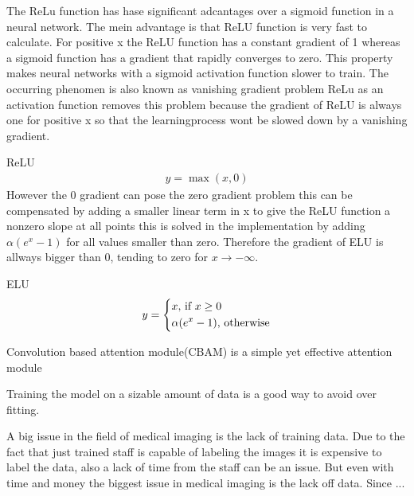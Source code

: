 \documentclass[
a4paper, 
12pt,
grayscalebody, %
abstract=on,
twoside, BCOR10mm, 12pt, DIV13,headinclude, footexclude, final, abstracton, openright
]{ibireprt}
\numberwithin{equation}{chapter}
\numberwithin{table}{chapter}
\numberwithin{figure}{chapter}
\numberwithin{algorithm}{chapter}
\numberwithin{example}{chapter}
\numberwithin{example}{chapter}
\begin{document}
The ReLu function has hase significant adcantages over a sigmoid function in a neural network. The mein advantage is that ReLU function is very fast to calculate. For positive x the ReLU function has a constant gradient of 1 whereas a sigmoid function has a gradient that rapidly converges to zero. This property makes neural networks with a sigmoid activation function slower to train. The occurring phenomen is also known as vanishing gradient problem %
ReLu as an activation function removes this problem because the gradient of ReLU is always one for positive x so that the learningprocess wont be slowed down by a vanishing gradient. 

 

ReLU
\begin{align}
	y = \max(x,0)
\end{align}
However the 0 gradient can pose the zero gradient problem this can be compensated by adding a smaller linear term in x to give the ReLU function a nonzero slope at all points this is solved in the implementation by adding $\alpha(e^x-1)$ for all values smaller than zero. Therefore the gradient of ELU is allways bigger than 0, tending to zero for $x \rightarrow - \infty$.

ELU
\begin{align}
	y = 
	\begin{dcases}
		x \text{, if } x \geq 0 \\
		\alpha(e^x-1) \text{, otherwise}
	\end{dcases}
\end{align}


Convolution based attention module(CBAM) is a simple yet effective attention module \cite{Woo2018}



Training the model on a sizable amount of data is a good way to avoid over fitting. 

A big issue in the field of medical imaging is the lack of training data. Due to the fact that just trained staff is capable of labeling the images it is expensive to label the data, also a lack of time from the staff can be an issue. But even with time and money the biggest issue in medical imaging is the lack off data. Since ... %
\end{document}
